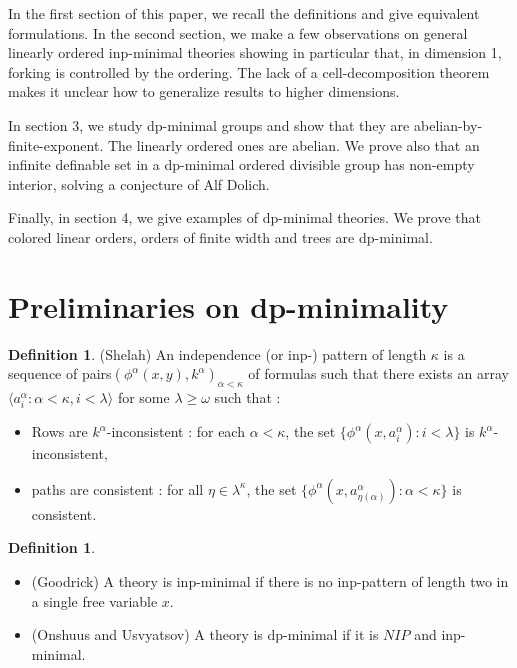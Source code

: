 \documentclass[english]{article}
\theoremstyle{definition}
\newtheorem{defi}[thm]{Definition}
\theoremstyle{mystyle}
\theoremstyle{remark}
\begin{document}
In the first section of this paper, we recall the definitions and give equivalent formulations. In the second section, we make a few observations on general linearly ordered inp-minimal theories showing in particular that, in dimension 1, forking is controlled by the ordering. The lack of a cell-decomposition theorem makes it unclear how to generalize results to higher dimensions.

In section 3, we study dp-minimal groups and show that they are abelian-by-finite-exponent. The linearly ordered ones are abelian. We prove also that an infinite definable set in a dp-minimal ordered divisible group has non-empty interior, solving a conjecture of Alf Dolich.

Finally, in section 4, we give examples of dp-minimal theories. We prove that colored linear orders, orders of finite width and trees are dp-minimal.

\section{Preliminaries on dp-minimality}

\begin{defi}
(Shelah) An independence (or inp-) pattern of length $\kappa$ is a sequence of pairs$(\phi^\alpha(x,y),k^\alpha)_{\alpha < \kappa}$ of formulas such that there exists an array $\langle a^\alpha_{i}: \alpha < \kappa, i < \lambda \rangle$ for some $\lambda \geq \omega$ such that :
\begin{itemize}
\item Rows are $k^\alpha$-inconsistent : for each $\alpha<\kappa$, the set $\{\phi^\alpha(x,a^\alpha_i) : i < \lambda\}$ is $k^\alpha$-inconsistent,
\item paths are consistent : for all $\eta \in \lambda^\kappa$, the set $\{\phi^\alpha(x,a^\alpha_{\eta(\alpha)}) : \alpha < \kappa\}$ is consistent.
\end{itemize}
\end{defi}

\begin{defi}
\begin{itemize}
\item (Goodrick) A theory is inp-minimal if there is no inp-pattern of length two in a single free variable $x$.
\item (Onshuus and Usvyatsov) A theory is dp-minimal if it is $NIP$ and inp-minimal.
\end{itemize}
\end{defi}
\end{document}
